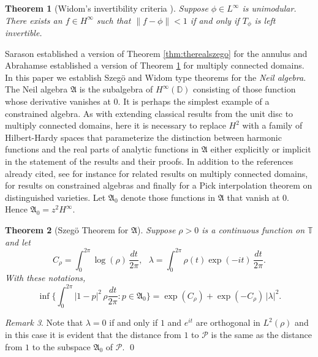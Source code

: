 \documentclass[12pt]{amsart}
\newtheorem{theorem}{Theorem}[section]
\theoremstyle{definition}
\theoremstyle{remark}
\newtheorem{remark}[theorem]{Remark}
\numberwithin{equation}{section}
\begin{document}
\begin{theorem}[Widom's invertibility criteria {\cite[Theorem 7.30]{douglas}}]
\label{thm:realwidom}
  Suppose $\phi \in L^\infty$ is unimodular. There exists an $f\in H^\infty$ such that $\|f-\phi\|<1$ if and only if $T_\phi$ is left invertible.
\end{theorem}

Sarason \cite{sarason} established a version of Theorem \ref{thm:therealszego} for the annulus and Abrahamse \cite[Theorems 4.1 and 4.6]{Ab} established
a version of Theorem \ref{thm:realwidom} for multiply connected domains.  In this paper we establish  Szeg\"o and Widom type theorems for the {{\it{{Neil algebra}}}{}}. The Neil algebra ${\mathfrak{A}}$  is the subalgebra of $H^\infty(\mathbb D)$ consisting 
of those function whose derivative vanishes at $0$. It is perhaps the simplest example of a constrained algebra. 
As with extending classical results from the unit disc to multiply connected domains,  here it is necessary to replace $H^2$ with a family of Hilbert-Hardy spaces that parameterize the distinction between harmonic functions and the real parts of analytic functions in ${\mathfrak{A}}$ either explicitly or implicit in the statement of the results and their proofs. In addition to the references already cited, see for instance \cite{Ab2,Ab3,mrinal,adam} for related results on multiply connected domains,
\cite{BBtH,BH1,BH2,DP, DPRS,mrinal, mrinal2} for results on constrained algebras and finally \cite{JKM} for a Pick interpolation theorem on distinguished varieties. 
Let ${\mathfrak{A}}_0$ denote those functions in ${\mathfrak{A}}$ that vanish at $0$. Hence ${\mathfrak{A}}_0=z^2 H^\infty$.   

\begin{theorem}[Szeg\"o Theorem for ${\mathfrak{A}}$]
\label{thm:SzegofA}
 Suppose ${\rho}>0$ is a continuous function on ${\mathbb T}$ and let
\[
 {C_{\rho}} ={\int_{0}^{2\pi}} \log({\rho})\, {\frac{dt}{2\pi}}, \ \ \ 
 \lambda =  \int_{0}^{2\pi} {\rho}(t)\exp(-it)\, \frac{dt}{2\pi}.
\]
With these notations,
\[
\inf\{ \int_{0}^{2\pi} |1-p|^2 \, {\rho} \frac{dt}{2\pi}: p\in {\mathfrak{A}}_0\}  = 
\exp({C_{\rho}}) + \exp(-{C_{\rho}})\, |\lambda|^2.
\]
\end{theorem}

\begin{remark}\rm
Note that $\lambda=0$ if and only if $1$ and $e^{it}$ are orthogonal in $L^2(\rho)$ and in this case it is evident that the distance from $1$ to $\mathscr{P}$
is the same as the distance from $1$ to the subspace ${\mathfrak{A}}_0$ of $\mathscr{P}$. \qed
\end{remark}
\end{document}
